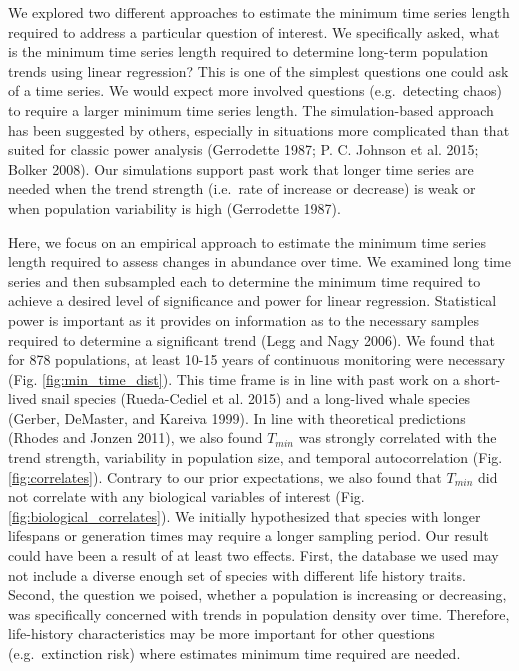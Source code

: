 \documentclass[12pt,]{article}
\begin{document}
We explored two different approaches to estimate the minimum time series
length required to address a particular question of interest. We
specifically asked, what is the minimum time series length required to
determine long-term population trends using linear regression? This is
one of the simplest questions one could ask of a time series. We would
expect more involved questions (e.g.~detecting chaos) to require a
larger minimum time series length. The simulation-based approach has
been suggested by others, especially in situations more complicated than
that suited for classic power analysis (Gerrodette 1987; P. C. Johnson
et al. 2015; Bolker 2008). Our simulations support past work that longer
time series are needed when the trend strength (i.e.~rate of increase or
decrease) is weak or when population variability is high (Gerrodette
1987).

Here, we focus on an empirical approach to estimate the minimum time
series length required to assess changes in abundance over time. We
examined long time series and then subsampled each to determine the
minimum time required to achieve a desired level of significance and
power for linear regression. Statistical power is important as it
provides on information as to the necessary samples required to
determine a significant trend (Legg and Nagy 2006). We found that for
878 populations, at least 10-15 years of continuous monitoring were
necessary (Fig. \ref{fig:min_time_dist}). This time frame is in line
with past work on a short-lived snail species (Rueda-Cediel et al. 2015)
and a long-lived whale species (Gerber, DeMaster, and Kareiva 1999). In
line with theoretical predictions (Rhodes and Jonzen 2011), we also
found \(T_{min}\) was strongly correlated with the trend strength,
variability in population size, and temporal autocorrelation (Fig.
\ref{fig:correlates}). Contrary to our prior expectations, we also found
that \(T_{min}\) did not correlate with any biological variables of
interest (Fig. \ref{fig:biological_correlates}). We initially
hypothesized that species with longer lifespans or generation times may
require a longer sampling period. Our result could have been a result of
at least two effects. First, the database we used may not include a
diverse enough set of species with different life history traits.
Second, the question we poised, whether a population is increasing or
decreasing, was specifically concerned with trends in population density
over time. Therefore, life-history characteristics may be more important
for other questions (e.g.~extinction risk) where estimates minimum time
required are needed.
\end{document}
